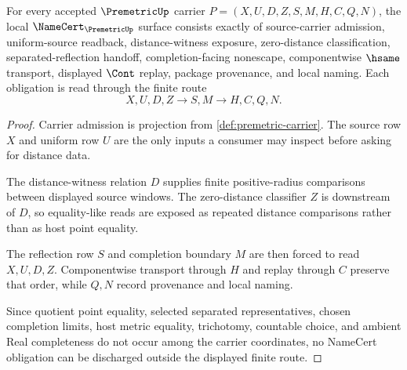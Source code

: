 \begin{theorem}
\label{thm:premetric-namecert-obligations}
For every accepted $\PremetricUp$ carrier $P=(X,U,D,Z,S,M,H,C,Q,N)$, the local $\NameCert_{\PremetricUp}$ surface consists exactly of source-carrier admission, uniform-source readback, distance-witness exposure, zero-distance classification, separated-reflection handoff, completion-facing nonescape, componentwise $\hsame$ transport, displayed $\Cont$ replay, package provenance, and local naming. Each obligation is read through the finite route
$$
X,U,D,Z \longrightarrow S,M \longrightarrow H,C,Q,N .
$$
\end{theorem}
\begin{proof}
Carrier admission is projection from \autoref{def:premetric-carrier}. The source row $X$ and uniform row $U$ are the only inputs a consumer may inspect before asking for distance data.

The distance-witness relation $D$ supplies finite positive-radius comparisons between displayed source windows. The zero-distance classifier $Z$ is downstream of $D$, so equality-like reads are exposed as repeated distance comparisons rather than as host point equality.

The reflection row $S$ and completion boundary $M$ are then forced to read $X,U,D,Z$. Componentwise transport through $H$ and replay through $C$ preserve that order, while $Q,N$ record provenance and local naming.

Since quotient point equality, selected separated representatives, chosen completion limits, host metric equality, trichotomy, countable choice, and ambient Real completeness do not occur among the carrier coordinates, no NameCert obligation can be discharged outside the displayed finite route.
\end{proof}

